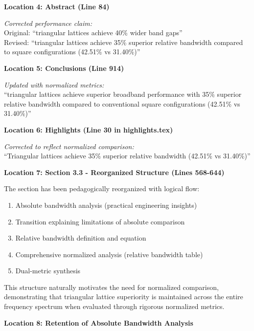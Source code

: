 \documentclass[11pt,a4paper]{article}
\newenvironment{changesbox}{%
    \par\medskip\noindent{\color{changescolor}\rule{\linewidth}{2pt}}\par
    \noindent{\color{changescolor}\bfseries Manuscript Changes}\par\smallskip
}{%
    \par\noindent{\color{changescolor}\rule{\linewidth}{0.5pt}}\medskip
}
\begin{document}
\begin{changesbox}
\textbf{Location 4: Abstract (Line 84)}

\textit{Corrected performance claim:}\\
Original: ``triangular lattices achieve 40\% wider band gaps''\\
Revised: \textcolor{redtext}{``triangular lattices achieve 35\% superior relative bandwidth compared to square configurations (42.51\% vs 31.40\%)''}

\textbf{Location 5: Conclusions (Line 914)}

\textit{Updated with normalized metrics:}\\
\textcolor{redtext}{``triangular lattices achieve superior broadband performance with 35\% superior relative bandwidth compared to conventional square configurations (42.51\% vs 31.40\%)''}

\textbf{Location 6: Highlights (Line 30 in highlights.tex)}

\textit{Corrected to reflect normalized comparison:}\\
\textcolor{redtext}{``Triangular lattices achieve 35\% superior relative bandwidth (42.51\% vs 31.40\%)''}

\textbf{Location 7: Section 3.3 - Reorganized Structure (Lines 568-644)}

The section has been pedagogically reorganized with logical flow:
\begin{enumerate}
    \item Absolute bandwidth analysis (practical engineering insights)
    \item Transition explaining limitations of absolute comparison
    \item Relative bandwidth definition and equation
    \item Comprehensive normalized analysis (relative bandwidth table)
    \item Dual-metric synthesis
\end{enumerate}

This structure naturally motivates the need for normalized comparison, demonstrating that triangular lattice superiority is maintained across the entire frequency spectrum when evaluated through rigorous normalized metrics.

\textbf{Location 8: Retention of Absolute Bandwidth Analysis}


\end{changesbox}
\end{document}
